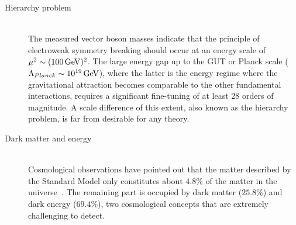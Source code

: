 \begin{myindentpar}
\begin{description}
    \item[Hierarchy problem] \hfill \\
    The measured vector boson masses indicate that the principle of electroweak symmetry breaking should occur at an energy scale of $\mu^{2} \sim (100 \, \mathrm{GeV})^{2}$.
    The large energy gap up to the GUT or Planck scale ($\Lambda_{Planck} \sim 10^{19} \, \mathrm{GeV}$), where the latter is the energy regime where the gravitational attraction becomes comparable to the other fundamental interactions, requires a significant fine-tuning of at least 28 orders of magnitude. 
    A scale difference of this extent, also known as the hierarchy problem, is far from desirable for any theory.
    
    \item[Dark matter and energy] \hfill \\
    Cosmological observations have pointed out that the matter described by the Standard Model only constitutes about $4.8 \%$ of the matter in the universe~\cite{PlanckResults}. The remaining part is occupied by dark matter ($25.8 \%$) and dark energy ($69.4 \%$), two cosmological concepts that are extremely challenging to detect.
    
    

\end{description}
\end{myindentpar}
